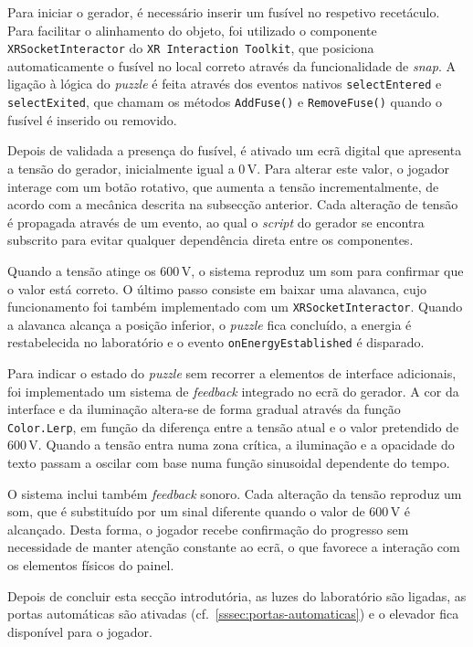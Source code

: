 \documentclass[a4paper, 12pt]{book}
\begin{document}
Para iniciar o gerador, é necessário inserir um fusível no respetivo
recetáculo. Para facilitar o alinhamento do objeto, foi utilizado o componente
\texttt{XRSocketInteractor} do \texttt{XR Interaction Toolkit}, que posiciona
automaticamente o fusível no local correto através da funcionalidade de
\textit{snap}. A ligação à lógica do \textit{puzzle} é feita através dos
eventos nativos \texttt{selectEntered} e \texttt{selectExited}, que chamam os
métodos \texttt{AddFuse()} e \texttt{RemoveFuse()} quando o fusível é inserido
ou removido. 

Depois de validada a presença do fusível, é ativado um ecrã digital que apresenta
a tensão do gerador, inicialmente igual a 0\,V. Para alterar este valor, o jogador
interage com um botão rotativo, que aumenta a tensão incrementalmente, de acordo
com a mecânica descrita na subsecção anterior. Cada alteração de tensão é
propagada através de um evento, ao qual o \textit{script} do gerador
se encontra subscrito para evitar qualquer dependência direta entre os componentes.

Quando a tensão atinge os 600\,V, o sistema reproduz um som para confirmar que o
valor está correto. O último passo consiste em baixar uma alavanca, cujo
funcionamento foi também implementado com um \texttt{XRSocketInteractor}. Quando a
alavanca alcança a posição inferior, o \textit{puzzle} fica concluído, a energia é
restabelecida no laboratório e o evento \texttt{onEnergyEstablished} é disparado.

Para indicar o estado do \textit{puzzle} sem recorrer a elementos de interface adicionais, foi
implementado um sistema de \textit{feedback} integrado no ecrã do gerador. A cor
da interface e da iluminação altera-se de forma gradual através da função
\texttt{Color.Lerp}, em função da diferença entre a tensão atual e o valor
pretendido de 600\,V. Quando a tensão entra numa zona crítica, a iluminação e a
opacidade do texto passam a oscilar com base numa função sinusoidal dependente
do tempo. 
\par
O sistema inclui também \textit{feedback} sonoro. Cada alteração
da tensão reproduz um som, que é substituído por um sinal diferente quando o
valor de 600\,V é alcançado. Desta forma, o jogador recebe confirmação do
progresso sem necessidade de manter atenção constante ao ecrã, o que favorece a
interação com os elementos físicos do painel.
\par
Depois de concluir esta secção introdutória, as luzes do laboratório são ligadas, 
as portas automáticas são ativadas (cf.~\ref{sssec:portas-automaticas}) e o elevador fica disponível para o jogador.
\end{document}
